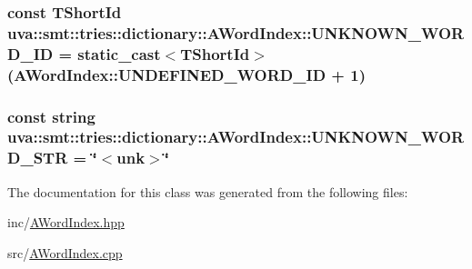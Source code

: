 \subsubsection[{U\+N\+K\+N\+O\+W\+N\+\_\+\+W\+O\+R\+D\+\_\+\+I\+D}]{\setlength{\rightskip}{0pt plus 5cm}const {\bf T\+Short\+Id} uva\+::smt\+::tries\+::dictionary\+::\+A\+Word\+Index\+::\+U\+N\+K\+N\+O\+W\+N\+\_\+\+W\+O\+R\+D\+\_\+\+I\+D = static\+\_\+cast$<${\bf T\+Short\+Id}$>$ ({\bf A\+Word\+Index\+::\+U\+N\+D\+E\+F\+I\+N\+E\+D\+\_\+\+W\+O\+R\+D\+\_\+\+I\+D} + 1)\hspace{0.3cm}{\ttfamily [static]}}\label{classuva_1_1smt_1_1tries_1_1dictionary_1_1_a_word_index_a975e0ce3eb5986019ef5b67cff84806e}
\hypertarget{classuva_1_1smt_1_1tries_1_1dictionary_1_1_a_word_index_a2059cfaea3b8d1253cafb9b3ccb1cc28}{}
\subsubsection[{U\+N\+K\+N\+O\+W\+N\+\_\+\+W\+O\+R\+D\+\_\+\+S\+T\+R}]{\setlength{\rightskip}{0pt plus 5cm}const string uva\+::smt\+::tries\+::dictionary\+::\+A\+Word\+Index\+::\+U\+N\+K\+N\+O\+W\+N\+\_\+\+W\+O\+R\+D\+\_\+\+S\+T\+R = \char`\"{}$<$unk$>$\char`\"{}\hspace{0.3cm}{\ttfamily [static]}}\label{classuva_1_1smt_1_1tries_1_1dictionary_1_1_a_word_index_a2059cfaea3b8d1253cafb9b3ccb1cc28}


The documentation for this class was generated from the following files\+:\begin{DoxyCompactItemize}
\item 
inc/\hyperlink{_a_word_index_8hpp}{A\+Word\+Index.\+hpp}\item 
src/\hyperlink{_a_word_index_8cpp}{A\+Word\+Index.\+cpp}\end{DoxyCompactItemize}
